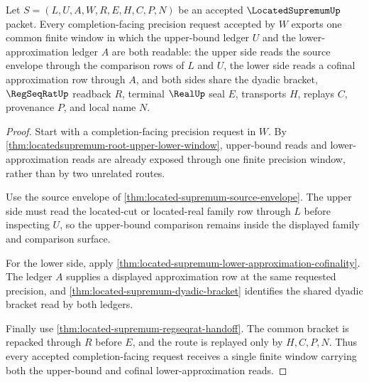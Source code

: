 \begin{theorem}
\label{thm:located-supremum-cofinal-window-totality}
Let $S=(L,U,A,W,R,E,H,C,P,N)$ be an accepted $\LocatedSupremumUp$ packet. Every completion-facing precision request accepted by $W$ exports one common finite window in which the upper-bound ledger $U$ and the lower-approximation ledger $A$ are both readable: the upper side reads the source envelope through the comparison rows of $L$ and $U$, the lower side reads a cofinal approximation row through $A$, and both sides share the dyadic bracket, $\RegSeqRatUp$ readback $R$, terminal $\RealUp$ seal $E$, transports $H$, replays $C$, provenance $P$, and local name $N$.
\end{theorem}
\begin{proof}
Start with a completion-facing precision request in $W$. By \autoref{thm:locatedsupremum-root-upper-lower-window}, upper-bound reads and lower-approximation reads are already exposed through one finite precision window, rather than by two unrelated routes.

Use the source envelope of \autoref{thm:located-supremum-source-envelope}. The upper side must read the located-cut or located-real family row through $L$ before inspecting $U$, so the upper-bound comparison remains inside the displayed family and comparison surface.

For the lower side, apply \autoref{thm:located-supremum-lower-approximation-cofinality}. The ledger $A$ supplies a displayed approximation row at the same requested precision, and \autoref{thm:located-supremum-dyadic-bracket} identifies the shared dyadic bracket read by both ledgers.

Finally use \autoref{thm:located-supremum-regseqrat-handoff}. The common bracket is repacked through $R$ before $E$, and the route is replayed only by $H,C,P,N$. Thus every accepted completion-facing request receives a single finite window carrying both the upper-bound and cofinal lower-approximation reads.
\end{proof}

